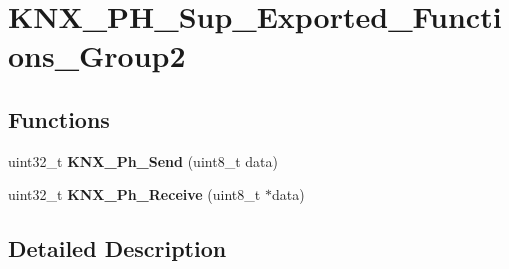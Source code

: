 \hypertarget{group___k_n_x___p_h___sup___exported___functions___group2}{}\section{K\+N\+X\+\_\+\+P\+H\+\_\+\+Sup\+\_\+\+Exported\+\_\+\+Functions\+\_\+\+Group2}
\label{group___k_n_x___p_h___sup___exported___functions___group2}
\subsection*{Functions}
\begin{DoxyCompactItemize}
\item 
uint32\+\_\+t {\bfseries K\+N\+X\+\_\+\+Ph\+\_\+\+Send} (uint8\+\_\+t data)\hypertarget{group___k_n_x___p_h___sup___exported___functions___group2_ga0c09176ded85af78b4fcb11f766bc8a5}{}\label{group___k_n_x___p_h___sup___exported___functions___group2_ga0c09176ded85af78b4fcb11f766bc8a5}

\item 
uint32\+\_\+t {\bfseries K\+N\+X\+\_\+\+Ph\+\_\+\+Receive} (uint8\+\_\+t $\ast$data)\hypertarget{group___k_n_x___p_h___sup___exported___functions___group2_gad3c39f6d20c7af25ec34aa9567ceefa5}{}\label{group___k_n_x___p_h___sup___exported___functions___group2_gad3c39f6d20c7af25ec34aa9567ceefa5}

\end{DoxyCompactItemize}


\subsection{Detailed Description}

